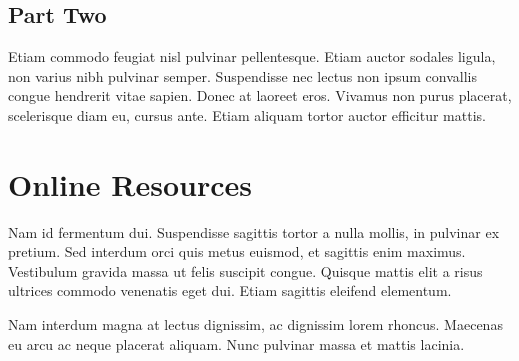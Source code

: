 \documentclass[sigconf]{acmart}
\begin{document}
\subsection{Part Two}

Etiam commodo feugiat nisl pulvinar pellentesque. Etiam auctor sodales
ligula, non varius nibh pulvinar semper. Suspendisse nec lectus non
ipsum convallis congue hendrerit vitae sapien. Donec at laoreet
eros. Vivamus non purus placerat, scelerisque diam eu, cursus
ante. Etiam aliquam tortor auctor efficitur mattis.

\section{Online Resources}

Nam id fermentum dui. Suspendisse sagittis tortor a nulla mollis, in
pulvinar ex pretium. Sed interdum orci quis metus euismod, et sagittis
enim maximus. Vestibulum gravida massa ut felis suscipit
congue. Quisque mattis elit a risus ultrices commodo venenatis eget
dui. Etiam sagittis eleifend elementum.

Nam interdum magna at lectus dignissim, ac dignissim lorem
rhoncus. Maecenas eu arcu ac neque placerat aliquam. Nunc pulvinar
massa et mattis lacinia.
\end{document}
